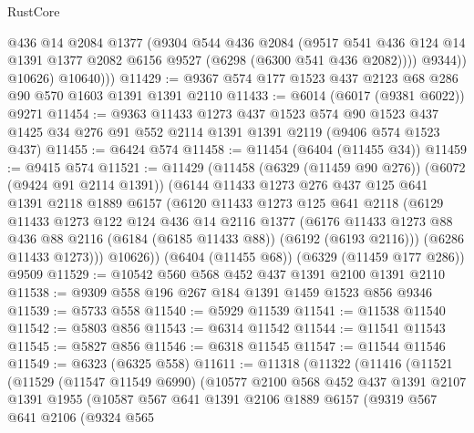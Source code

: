 \begin{lexlean}{RustCore}
\begin{coremodule}
                @436
                @14
                @2084
                @1377
                (@9304
                  @544
                  @436
                  @2084
                  (@9517
                    @541
                    @436
                    @124
                    @14
                    @1391
                    @1377
                    @2082
                    @6156
                    @9527
                    (@6298 (@6300 @541 @436 @2082))))
                @9344))
            @10626)
          @10640)))
@11429 := @9367 @574 @177 @1523 @437 @2123 @68 @286 @90 @570 @1603 @1391 @1391 @2110
@11433 := @6014 (@6017 (@9381 @6022)) @9271
@11454 := @9363
    @11433
    @1273
    @437
    @1523
    @574
    @90
    @1523
    @437
    @1425
    @34
    @276
    @91
    @552
    @2114
    @1391
    @1391
    @2119
    (@9406 @574 @1523 @437)
@11455 := @6424 @574
@11458 := @11454 (@6404 (@11455 @34))
@11459 := @9415 @574
@11521 := @11429
    (@11458
      (@6329 (@11459 @90 @276))
      (@6072 (@9424 @91 @2114 @1391))
      (@6144
        @11433
        @1273
        @276
        @437
        @125
        @641
        @1391
        @2118
        @1889
        @6157
        (@6120
          @11433
          @1273
          @125
          @641
          @2118
          (@6129
            @11433
            @1273
            @122
            @124
            @436
            @14
            @2116
            @1377
            (@6176 @11433 @1273 @88 @436 @88 @2116 (@6184 (@6185 @11433 @88)) (@6192 (@6193 @2116)))
            (@6286 @11433 @1273)))
        @10626))
    (@6404 (@11455 @68))
    (@6329 (@11459 @177 @286))
    @9509
@11529 := @10542 @560 @568 @452 @437 @1391 @2100 @1391 @2110
@11538 := @9309 @558 @196 @267 @184 @1391 @1459 @1523 @856 @9346
@11539 := @5733 @558
@11540 := @5929 @11539
@11541 := @11538 @11540
@11542 := @5803 @856
@11543 := @6314 @11542
@11544 := @11541 @11543
@11545 := @5827 @856
@11546 := @6318 @11545
@11547 := @11544 @11546
@11549 := @6323 (@6325 @558)
@11611 := @11318
    (@11322
      (@11416
        (@11521
          (@11529
            (@11547 @11549 @6990)
            (@10577
              @2100
              @568
              @452
              @437
              @1391
              @2107
              @1391
              @1955
              (@10587
                @567
                @641
                @1391
                @2106
                @1889
                @6157
                (@9319
                  @567
                  @641
                  @2106
                  (@9324
                    @565

\end{coremodule}
\end{lexlean}
